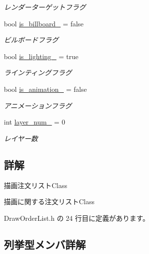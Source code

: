 \begin{DoxyCompactItemize}
\begin{DoxyCompactList}\small\item\em レンダーターゲットフラグ \end{DoxyCompactList}\item 
bool \mbox{\hyperlink{class_draw_order_list_ae9a77121ff108d8f0ee0c73065f99a75}{is\+\_\+billboard\+\_\+}} = false
\begin{DoxyCompactList}\small\item\em ビルボードフラグ \end{DoxyCompactList}\item 
bool \mbox{\hyperlink{class_draw_order_list_a26e72a0f47cc2c791eeb87fe6aadeee9}{is\+\_\+lighting\+\_\+}} = true
\begin{DoxyCompactList}\small\item\em ラインティングフラグ \end{DoxyCompactList}\item 
bool \mbox{\hyperlink{class_draw_order_list_a002c0ace5780bf451d2c0fefad9385be}{is\+\_\+animation\+\_\+}} = false
\begin{DoxyCompactList}\small\item\em アニメーションフラグ \end{DoxyCompactList}\item 
int \mbox{\hyperlink{class_draw_order_list_aff49851688a106fc572abab6e65506b8}{layer\+\_\+num\+\_\+}} = 0
\begin{DoxyCompactList}\small\item\em レイヤー数 \end{DoxyCompactList}\end{DoxyCompactItemize}


\subsection{詳解}
描画注文リスト\+Class 

描画に関する注文リスト\+Class 

 Draw\+Order\+List.\+h の 24 行目に定義があります。



\subsection{列挙型メンバ詳解}
\mbox{\label{class_draw_order_list_a6c9b9ceb312c16d399ef355f4f3486bb}} 
